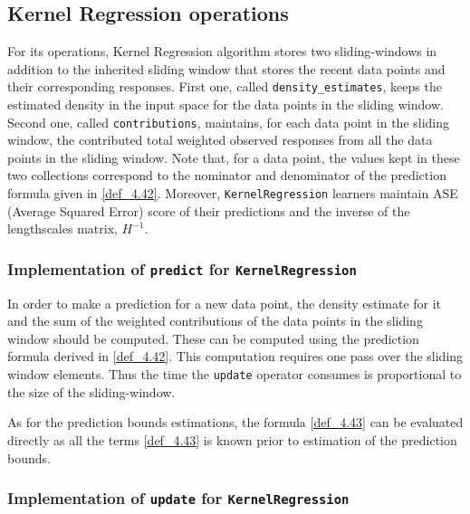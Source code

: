 \subsection{Kernel Regression operations}

For its operations, Kernel Regression algorithm stores two sliding-windows in addition to the inherited sliding window that stores the recent data points and their corresponding responses. First one, called \texttt{density\_estimates}, keeps the estimated density in the input space for the data points in the sliding window. Second one, called \texttt{contributions}, maintains, for each data point in the sliding window, the contributed total weighted observed responses from all the data points in the sliding window. Note that, for a data point, the values kept in these two collections correspond to the nominator and denominator of the prediction formula given in \ref{def_4.42}. Moreover, \texttt{KernelRegression} learners maintain ASE (Average Squared Error) score of their predictions and the inverse of the lengthscales matrix, $H^{-1}$.

\subsubsection{Implementation of \texttt{predict} for \texttt{KernelRegression}}

In order to make a prediction for a new data point, the density estimate for it and the sum of the weighted contributions of the data points in the sliding window should be computed. These can be computed using the prediction formula derived in \ref{def_4.42}. This computation requires one pass over the sliding window elements. Thus the time the \texttt{update} operator consumes is proportional to the size of the sliding-window.

As for the prediction bounds estimations, the formula \ref{def_4.43} can be evaluated directly as all the terms  \ref{def_4.43} is known prior to estimation of the prediction bounds.

\subsubsection{Implementation of \texttt{update} for \texttt{KernelRegression}}

